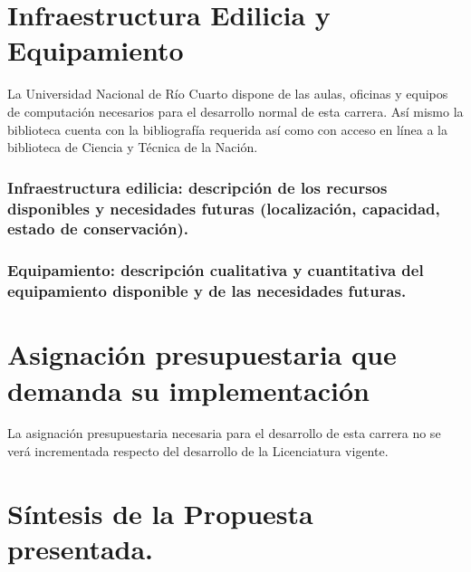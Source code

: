 \documentclass[a4paper, 12pt]{article}
\begin{document}
\section{Infraestructura Edilicia y Equipamiento}
 La Universidad
Nacional de Río Cuarto dispone de las aulas, oficinas y equipos de
computación necesarios para el desarrollo normal de esta carrera.
Así mismo la biblioteca cuenta con la bibliografía requerida así
como con acceso en línea   a la biblioteca de Ciencia y Técnica de
la Nación.

\subsubsection{Infraestructura edilicia: descripción de los recursos disponibles y necesidades futuras (localización, capacidad, estado de conservación).} 
\subsubsection{Equipamiento: descripción cualitativa y cuantitativa del equipamiento disponible y de las necesidades futuras.}



\section{Asignación presupuestaria que demanda su
implementación}

La asignación presupuestaria necesaria para el desarrollo de esta
carrera no se verá incrementada respecto del desarrollo de la
Licenciatura vigente.


\section{Síntesis de la Propuesta presentada. }






\end{document}
